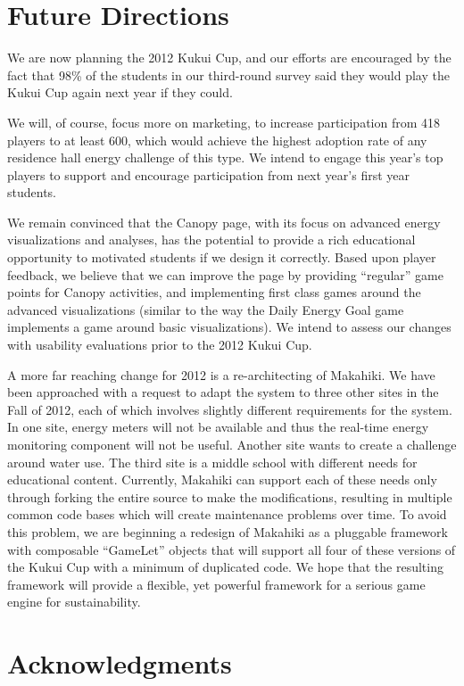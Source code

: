 \documentclass{acm_proc_article-sp}
\begin{document}
\section{Future Directions}

We are now planning the 2012 Kukui Cup, and our efforts are encouraged
by the fact that 98\% of the students in our third-round survey said they
would play the Kukui Cup again next year if they could.

We will, of course, focus more on marketing, to increase participation from 418
players to at least 600, which would achieve the highest adoption rate of any
residence hall energy challenge of this type.  We intend to engage this year's
top players to support and encourage participation from next year's first year
students.

We remain convinced that the Canopy page, with its focus on advanced energy
visualizations and analyses, has the potential to provide a rich educational
opportunity to motivated students if we design it correctly.  Based upon player
feedback, we believe that we can improve the page by providing ``regular'' game
points for Canopy activities, and implementing first class games around the
advanced visualizations (similar to the way the Daily Energy Goal game
implements a game around basic visualizations).  We intend to assess our
changes with usability evaluations prior to the 2012 Kukui Cup.

A more far reaching change for 2012 is a re-architecting of Makahiki.  We have
been approached with a request to adapt the system to three other sites in the
Fall of 2012, each of which involves slightly different requirements for the
system. In one site, energy meters will not be available and thus the real-time
energy monitoring component will not be useful. Another site wants to create a
challenge around water use.  The third site is a middle school with different
needs for educational content. Currently, Makahiki can support each of these
needs only through forking the entire source to make the modifications,
resulting in multiple common code bases which will create maintenance problems
over time.  To avoid this problem, we are beginning a redesign of Makahiki as a
pluggable framework with composable ``GameLet'' objects that will support all
four of these versions of the Kukui Cup with a minimum of duplicated code.  We
hope that the resulting framework will provide a flexible, yet powerful
framework for a serious game engine for sustainability.

\section{Acknowledgments}
\end{document}
